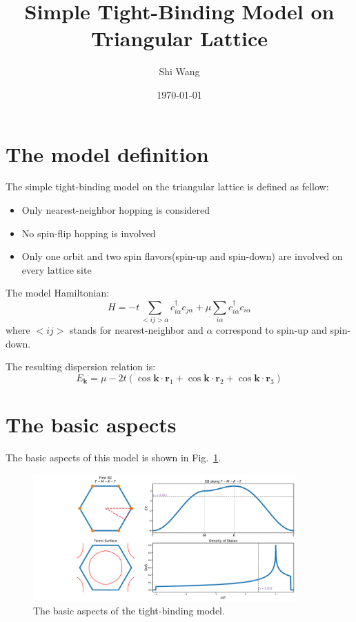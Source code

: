 \documentclass[aps,prl,preprint]{revtex4}
\begin{document}
\title{Simple Tight-Binding Model on Triangular Lattice}

\author{Shi Wang}


\date{\today}

\maketitle

\section{The model definition}

The simple tight-binding model on the triangular lattice is defined as fellow:
\begin{itemize}[leftmargin=2cm]
    \item Only nearest-neighbor hopping is considered
    \item No spin-flip hopping is involved
    \item Only one orbit and two spin flavors(spin-up and spin-down) are involved on every lattice site
\end{itemize}

The model Hamiltonian:
\begin{equation}
    H = -t \sum_{<ij>\alpha} c_{i\alpha}^{\dagger} c_{j\alpha} + \mu \sum_{i\alpha} c_{i\alpha}^{\dagger} c_{i\alpha}
\end{equation}
where $<ij>$ stands for nearest-neighbor and $\alpha$ correspond to spin-up and spin-down.

The resulting dispersion relation is:
\begin{equation}
    E_{\bm{k}} = \mu - 2t (\cos \bm{k} \cdot \bm{r}_{1} + \cos \bm{k} \cdot \bm{r}_{2} + \cos \bm{k} \cdot \bm{r}_{3})
\end{equation}

\section{The basic aspects}

The basic aspects of this model is shown in Fig.~\ref{fig:BasicsOfTriangleSimpleTB}.
\begin{figure}[h]
    \includegraphics[width=0.9\textwidth]{BasicsOfTriangleSimpleTB.pdf}
    \caption{\label{fig:BasicsOfTriangleSimpleTB}The basic aspects of the tight-binding model.}
\end{figure}
\end{document}
